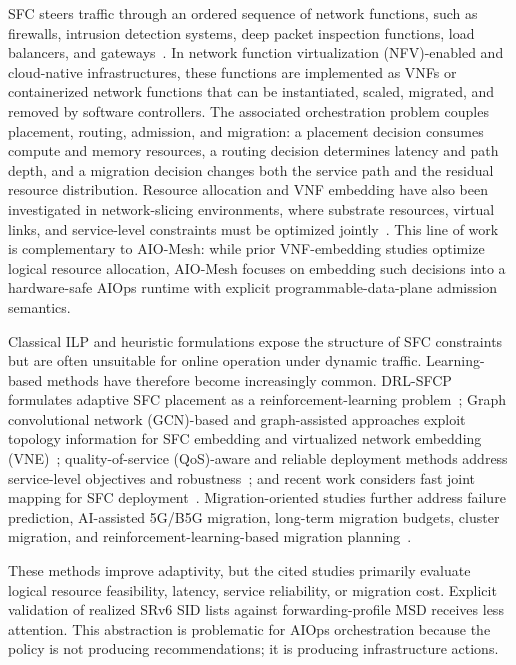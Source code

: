 \documentclass[final,5p]{elsarticle}
\newcommand{\rev}[1]{\textcolor{BrickRed}{#1}}
\begin{document}
\rev{SFC} steers traffic through an ordered sequence of network functions, such as firewalls, intrusion detection systems, deep packet inspection functions, load balancers, and gateways~\cite{rfc7665}. In \rev{network function virtualization (NFV)}-enabled and cloud-native infrastructures, these functions are implemented as VNFs or containerized network functions that can be instantiated, scaled, migrated, and removed by software controllers. The associated orchestration problem couples placement, routing, admission, and migration: a placement decision consumes compute and memory resources, a routing decision determines latency and path depth, and a migration decision changes both the service path and the residual resource distribution. Resource allocation and VNF embedding have also been investigated in network-slicing environments, where substrate resources, virtual links, and service-level constraints must be optimized jointly~\cite{jOptimizeSlice24}. This line of work is complementary to AIO-Mesh: while prior VNF-embedding studies optimize logical resource allocation, AIO-Mesh focuses on embedding such decisions into a hardware-safe AIOps runtime with explicit programmable-data-plane admission semantics.

Classical ILP and heuristic formulations expose the structure of SFC constraints but are often unsuitable for online operation under dynamic traffic. Learning-based methods have therefore become increasingly common. DRL-SFCP formulates adaptive SFC placement as a reinforcement-learning problem~\cite{wang2021drl}; \rev{Graph convolutional network (GCN)}-based and graph-assisted approaches exploit topology information for SFC embedding and virtualized network embedding \rev{(VNE)}~\cite{xiao2023twostage,pei2025graph,liu2024sfcml}; \rev{quality-of-service (QoS)}-aware and reliable deployment methods address service-level objectives and robustness~\cite{taktak2024drl,li2023qosaware,qu2021reliable}; and recent work considers fast joint mapping for SFC deployment~\cite{wu2025drl}. Migration-oriented studies further address failure prediction, AI-assisted 5G/B5G migration, long-term migration budgets, cluster migration, and reinforcement-learning-based migration planning~\cite{zhai2023migration,addad2022ai,qin2023sfcmigrationbudget,afrasiabi2024cluster,zhang2025sfcmigration,hu2026rlpmo}.

These methods improve adaptivity, but \rev{the cited studies primarily evaluate logical resource feasibility, latency, service reliability, or migration cost. Explicit validation of realized SRv6 SID lists against forwarding-profile MSD receives less attention.} This abstraction is problematic for AIOps orchestration because the policy is not producing recommendations; it is producing infrastructure actions.
\end{document}
